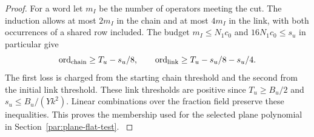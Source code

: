 \begin{proof}
For a word let \(m_I\) be the number of operators meeting
the cut. The induction allows at most \(2m_I\) in the
chain and at most \(4m_I\) in the link, with both occurrences
of a shared row included. The budget \(m_I\le N_1c_0\) and
\(16N_1c_0\le s_u\) in particular give
\[
    \operatorname{ord}_{\rm chain}\ge T_u-s_u/8,\qquad
    \operatorname{ord}_{\rm link}\ge T_u-s_u/8-s_u/4 .
\]
The first loss is charged from the starting chain threshold
and the second from the initial link threshold.
These link thresholds are positive since \(T_u\ge B_u/2\)
and \(s_u\le B_u/(Yk^2)\). Linear combinations over the fraction field
preserve these inequalities. This proves the membership used for
the selected plane polynomial in Section~\ref{par:plane-flat-test}.
 \label{cor:plane-orbit-1}
\end{proof}
